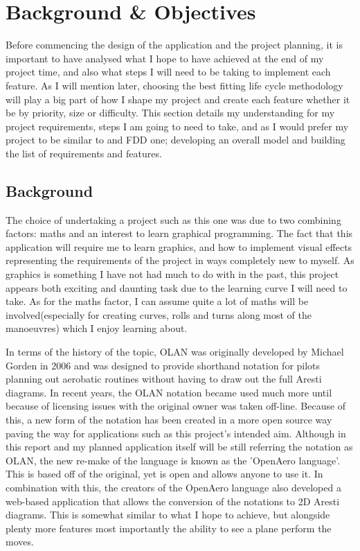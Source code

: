 \chapter{Background \& Objectives}
Before commencing the design of the application and the project planning, it is important to have analysed what I hope to have achieved at the end of my project time, and also what steps I will need to be taking to implement each feature. As I will mention later, choosing the best fitting life cycle methodology will play a big part of how I shape my project and create each feature whether it be by priority, size or difficulty. This section details my understanding for my project requirements, steps I am going to need to take, and as I would prefer my project to be similar to and FDD one; developing an overall model and building the list of requirements and features.

\section{Background}
The choice of undertaking a project such as this one was due to two combining factors: maths and an interest to learn graphical programming. The fact that this application will require me to learn graphics, and how to implement visual effects representing the requirements of the project in ways completely new to myself. As graphics is something I have not had much to do with in the past, this project appears both exciting and daunting task due to the learning curve I will need to take. As for the maths factor, I can assume quite a lot of maths will be involved(especially for creating curves, rolls and turns along most of the manoeuvres) which I enjoy learning about.

In terms of the history of the topic, OLAN was originally developed by Michael Gorden in 2006\cite{Olan_Intro} and was designed to provide shorthand notation for pilots planning out aerobatic routines without having to draw out the full Aresti diagrams. In recent years, the OLAN notation became used much more until because of licensing issues with the original owner was taken off-line. Because of this, a new form of the notation has been created in a more open source way paving the way for applications such as this project's intended aim. Although in this report and my planned application itself will be still referring the notation as OLAN, the new re-make of the language is known as the 'OpenAero language'\cite{OpenAero_Language}. This is based off of the original, yet is open and allows anyone to use it. In combination with this, the creators of the OpenAero language also developed a web-based application\cite{OpenAero_Application} that allows the conversion of the notations to 2D Aresti diagrams. This is somewhat similar to what I hope to achieve, but alongside plenty more features most importantly the ability to see a plane perform the moves.

